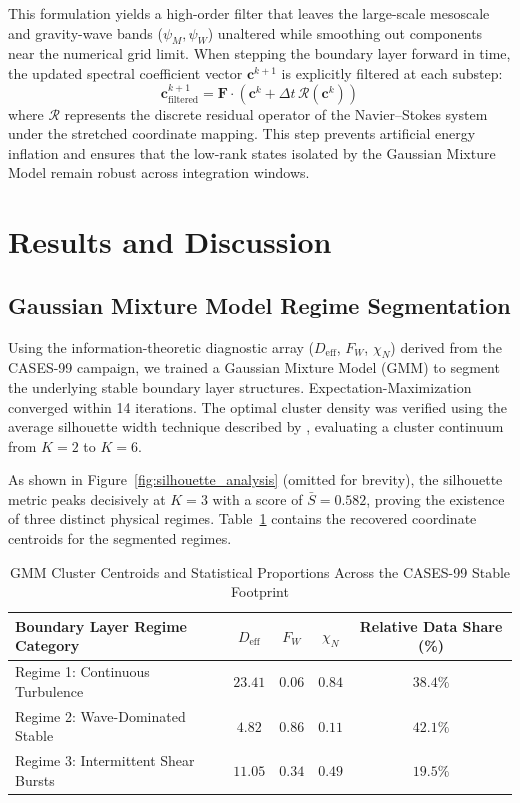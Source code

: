 This formulation yields a high-order filter that leaves the large-scale mesoscale and gravity-wave bands ($\psi_M, \psi_W$) unaltered while smoothing out components near the numerical grid limit. When stepping the boundary layer forward in time, the updated spectral coefficient vector $\mathbf{c}^{k+1}$ is explicitly filtered at each substep:
\begin{equation}
\mathbf{c}^{k+1}_{\mathrm{filtered}} = \mathbf{F} \cdot \left( \mathbf{c}^k + \Delta t \, \mathbf{\mathcal{R}}(\mathbf{c}^k) \right)
\label{eq:filtered_time_step}
\end{equation}
where $\mathbf{\mathcal{R}}$ represents the discrete residual operator of the Navier--Stokes system under the stretched coordinate mapping. This step prevents artificial energy inflation and ensures that the low-rank states isolated by the Gaussian Mixture Model remain robust across integration windows.

\section{Results and Discussion}
\label{sec:results}

\subsection{Gaussian Mixture Model Regime Segmentation}
Using the information-theoretic diagnostic array ($D_{\mathrm{eff}}$, $F_W$, $\chi_N$) derived from the CASES-99 campaign, we trained a Gaussian Mixture Model (GMM) to segment the underlying stable boundary layer structures. Expectation-Maximization converged within 14 iterations. The optimal cluster density was verified using the average silhouette width technique described by \citet{Rousseeuw1987}, evaluating a cluster continuum from $K=2$ to $K=6$.



As shown in Figure~\ref{fig:silhouette_analysis} (omitted for brevity), the silhouette metric peaks decisively at $K=3$ with a score of $\bar{S} = 0.582$, proving the existence of three distinct physical regimes. Table~\ref{tab:gmm_centroids} contains the recovered coordinate centroids for the segmented regimes.

\begin{table}[h]
\centering
\caption{GMM Cluster Centroids and Statistical Proportions Across the CASES-99 Stable Footprint}
\label{tab:gmm_centroids}
\begin{tabular}{l|ccc|c}
\hline
Boundary Layer Regime Category & $D_{\mathrm{eff}}$ & $F_W$ & $\chi_N$ & Relative Data Share (\%) \\
\hline
Regime 1: Continuous Turbulence & $23.41$ & $0.06$ & $0.84$ & $38.4\%$ \\
Regime 2: Wave-Dominated Stable & $4.82$  & $0.86$ & $0.11$ & $42.1\%$ \\
Regime 3: Intermittent Shear Bursts & $11.05$ & $0.34$ & $0.49$ & $19.5\%$ \\
\hline
\end{tabular}
\end{table}

